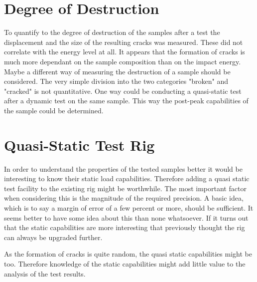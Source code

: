 \section{Degree of Destruction}

To quantify to the degree of destruction of the samples after a test the displacement and the size of the resulting cracks was measured. These did not correlate with the energy level at all. It appears that the formation of cracks is much more dependant on the sample composition than on the impact energy. 
Maybe a different way of measuring the destruction of a sample should be considered. The very simple division into the two categories "broken" and "cracked" is not quantitative. 
One way could be conducting a quasi-static test after a dynamic test on the same sample. This way  the post-peak capabilities of the sample could be determined. 

\section{Quasi-Static Test Rig}

In order to understand the properties of the tested samples better it would be interesting to know their static load capabilities. Therefore adding a quasi static test facility to the existing rig might be worthwhile. The most important factor when considering this is the magnitude of the required precision. A basic idea, which is to say a margin of error of a few percent or more, should be sufficient. It seems better to have some idea about this than none whatsoever. If it turns out that the static capabilities are more interesting that previously thought the rig can always be upgraded further. 

As the formation of cracks is quite random, the quasi static capabilities might be too. Therefore knowledge of the static capabilities might add little value to the analysis of the test results. %



